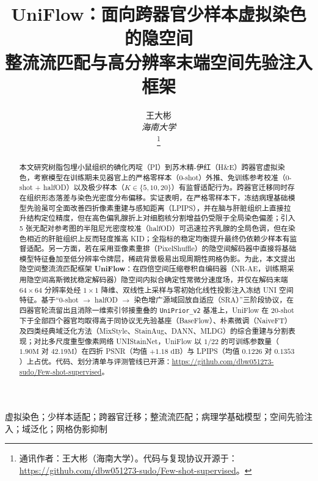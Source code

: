 \documentclass[journal]{IEEEtran}
\newcommand{\methodname}{UniFlow}
\begin{document}
\title{\methodname{}：面向跨器官少样本虚拟染色的隐空间\\整流流匹配与高分辨率末端空间先验注入框架}

\author{王大彬\\{\itshape 海南大学}\\
\thanks{通讯作者：王大彬（海南大学）。代码与复现协议开源于：\url{https://github.com/dbw051273-sudo/Few-shot-supervised}。}}

\maketitle

\begin{abstract}
本文研究树脂包埋小鼠组织的碘化丙啶（PI）到苏木精-伊红（H\&E）跨器官虚拟染色，考察模型在训练期未见器官上的严格零样本（0-shot）外推、免训练参考校准（0-shot + halfOD）以及极少样本（$K \in \{5, 10, 20\}$）有监督适配行为。跨器官迁移同时存在组织形态落差与染色光密度分布偏移。实证表明，在严格零样本下，冻结病理基础模型先验虽可全面改善四折像素重建与感知距离（LPIPS），并在脑与肝脏组织上直接拉升结构定位精度，但在高色偏乳腺折上对细胞核分割增益仍受限于全局染色偏差；引入 5 张无配对参考图的半阻尼光密度校准（halfOD）可迅速拉齐乳腺的全局色调，但在染色相近的肝脏组织上反而轻度推高 KID；全指标的稳定均衡提升最终仍依赖少样本有监督适配。另一方面，若在采用亚像素重排（PixelShuffle）的隐空间解码器中直接将基础模型特征叠加至低分辨率令牌层，稀疏背景极易出现周期性网格伪影。为此，本文提出隐空间整流流匹配框架 \textbf{\methodname{}}：在四倍空间压缩卷积自编码器（NR-AE，训练期采用隐空间高斯微扰稳定解码器）隐空间内拟合确定性常微分速度场，并仅在解码末端 $64\times 64$ 分辨率处经 $1\times 1$ 降维、双线性上采样与零初始化线性投影注入冻结 UNI 空间特征。基于“0-shot $\to$ halfOD $\to$ 染色增广源域回放自适应（SRA）”三阶段协议，在四器官轮流留出且消除一维索引邻接重叠的 \texttt{UniPrior\_v2} 基准上，\methodname{} 在 20-shot 下于全部四个器官均取得高于同协议无先验基座（BaseFlow）、朴素微调（NaiveFT）及四类经典域泛化方法（MixStyle、StainAug、DANN、MLDG）的综合重建与分割表现；对比多尺度重型像素网络 UNIStainNet，\methodname{} 以 $1/22$ 的可训练参数量（$1.90\text{M}$ 对 $42.19\text{M}$）在四折 PSNR（均值 $+1.18\text{ dB}$）与 LPIPS（均值 $0.1226$ 对 $0.1353$）上占优。代码、划分清单与评测管线已开源：\url{https://github.com/dbw051273-sudo/Few-shot-supervised}。
\end{abstract}

\begin{IEEEkeywords}
虚拟染色；少样本适配；跨器官迁移；整流流匹配；病理学基础模型；空间先验注入；域泛化；网格伪影抑制
\end{IEEEkeywords}
\end{document}

